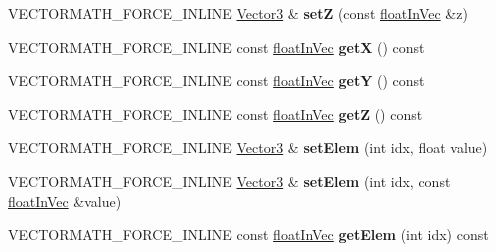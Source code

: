 \begin{DoxyCompactItemize}
\item 
\mbox{\label{classVectormath_1_1Aos_1_1Vector3_af1f3c8f9f3de411bdd063345773b2921}} 
V\+E\+C\+T\+O\+R\+M\+A\+T\+H\+\_\+\+F\+O\+R\+C\+E\+\_\+\+I\+N\+L\+I\+NE \hyperlink{classVectormath_1_1Aos_1_1Vector3}{Vector3} \& {\bfseries setZ} (const \hyperlink{classVectormath_1_1floatInVec}{float\+In\+Vec} \&z)
\item 
\mbox{\label{classVectormath_1_1Aos_1_1Vector3_ad912f9b3f232b6106e5596d98d4f6fa3}} 
V\+E\+C\+T\+O\+R\+M\+A\+T\+H\+\_\+\+F\+O\+R\+C\+E\+\_\+\+I\+N\+L\+I\+NE const \hyperlink{classVectormath_1_1floatInVec}{float\+In\+Vec} {\bfseries getX} () const
\item 
\mbox{\label{classVectormath_1_1Aos_1_1Vector3_ace755b6ddb0f67120ca069fe129b7e07}} 
V\+E\+C\+T\+O\+R\+M\+A\+T\+H\+\_\+\+F\+O\+R\+C\+E\+\_\+\+I\+N\+L\+I\+NE const \hyperlink{classVectormath_1_1floatInVec}{float\+In\+Vec} {\bfseries getY} () const
\item 
\mbox{\label{classVectormath_1_1Aos_1_1Vector3_aeeae7db699654f849bc081dd43cbf1ff}} 
V\+E\+C\+T\+O\+R\+M\+A\+T\+H\+\_\+\+F\+O\+R\+C\+E\+\_\+\+I\+N\+L\+I\+NE const \hyperlink{classVectormath_1_1floatInVec}{float\+In\+Vec} {\bfseries getZ} () const
\item 
\mbox{\label{classVectormath_1_1Aos_1_1Vector3_a11b90185445cff075229be855e0cb73a}} 
V\+E\+C\+T\+O\+R\+M\+A\+T\+H\+\_\+\+F\+O\+R\+C\+E\+\_\+\+I\+N\+L\+I\+NE \hyperlink{classVectormath_1_1Aos_1_1Vector3}{Vector3} \& {\bfseries set\+Elem} (int idx, float value)
\item 
\mbox{\label{classVectormath_1_1Aos_1_1Vector3_a817e59ab224807b2a673f3b13c8fcf69}} 
V\+E\+C\+T\+O\+R\+M\+A\+T\+H\+\_\+\+F\+O\+R\+C\+E\+\_\+\+I\+N\+L\+I\+NE \hyperlink{classVectormath_1_1Aos_1_1Vector3}{Vector3} \& {\bfseries set\+Elem} (int idx, const \hyperlink{classVectormath_1_1floatInVec}{float\+In\+Vec} \&value)
\item 
\mbox{\label{classVectormath_1_1Aos_1_1Vector3_a0a307516df3385074aa2e3477c5e8517}} 
V\+E\+C\+T\+O\+R\+M\+A\+T\+H\+\_\+\+F\+O\+R\+C\+E\+\_\+\+I\+N\+L\+I\+NE const \hyperlink{classVectormath_1_1floatInVec}{float\+In\+Vec} {\bfseries get\+Elem} (int idx) const

\end{DoxyCompactItemize}
